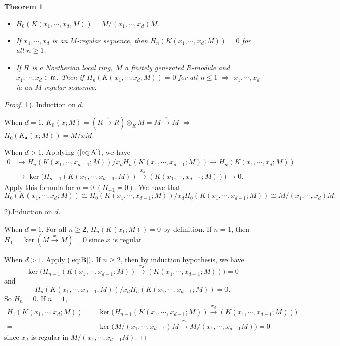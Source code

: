\documentclass[cs4size]{article}
\newcommand{\frm}{\mathfrak{m}}
\newcommand{\ra}{\rightarrow}
\newcommand{\xr}{\xrightarrow}
\newcommand{\Ra}{\Rightarrow}
\newtheorem{thm}{Theorem}
\begin{document}
\begin{thm}
\begin{itemize}
\item $H_0(K(x_1,\cdots,x_d,M))=M/(x_1,\cdots,x_d)M.$
\item If $x_1,\cdots,x_d$ is an $M$-regular sequence, then $H_n(K(x_1,\cdots,x_d;M))=0$ for all $n\geq 1$.
\item If $R$ is a Noetherian local ring, $M$ a finitely generated $R$-module and $x_1,\cdots,x_d\in\frm$. Then if $H_n(K(x_1,\cdots,x_d;M))=0$ for all $n\leq1$ $\Ra$ $x_1,\cdots,x_d$ ia an $M$-regular sequence.
\end{itemize}
\end{thm}
\begin{proof}
1). Induction on $d$.

When $d=1$. $K_0(x;M)=(R\xr{x}R)\otimes_RM=M\xr{x}M$ $\Ra$ $H_0(K_\bullet(x;M))=M/xM$.

When $d>1$. Applying $(\ref{eq:A})$, we have
\begin{equation}
\begin{split}
0&\ra H_n(K(x_1,\cdots,x_{d-1};M))/x_dH_n(K(x_1,\cdots,x_{d-1};M))\ra H_n(K(x_1,\cdots,x_d;M))\\
&\ra \ker \big(H_{n-1}(K(x_1,\cdots,x_{d-1};M))\xr{x_d}(K(x_1,\cdots,x_{d-1};M))\big)\ra 0.\label{eq:B}
\end{split}
\end{equation}
 Apply this formula for $n=0$ $(H_{-1}=0)$. We have that
\[H_0(K(x_1,\cdots,x_d;M))\cong H_0(K(x_1,\cdots,x_{d-1};M))/x_dH_0(K(x_1,\cdots,x_{d-1};M))\cong M/(x_1,\cdots,x_d)M.\]

2).Induction on $d$.

When $d=1$. For all $n\geq 2$, $H_n(K(x_1;M))=0$ by definition. If $n=1$, then $H_1=\ker(M\xr{x} M)=0$ since $x$ is regular.

When $d>1$. Apply $(\ref{eq:B})$. If $n\geq 2$, then by induction hypothesis, we have
\[\ker \big(H_{n-1}(K(x_1,\cdots,x_{d-1};M))\xr{x_d}(K(x_1,\cdots,x_{d-1};M))\big)=0\] and
\[H_n(K(x_1,\cdots,x_{d-1};M))/x_dH_n(K(x_1,\cdots,x_{d-1};M))=0.\]
So $H_n=0$.
If $n=1$,
\begin{align*}
H_1(K(x_1,\cdots,x_d;M))=&\ker \big(H_{n-1}(K(x_1,\cdots,x_{d-1};M))\xr{x_d}(K(x_1,\cdots,x_{d-1};M))\big)\\
=&\ker \big(M/(x_1,\cdots,x_{d-1})M\xr{x_d}M/(x_1,\cdots,x_{d-1}M)\big)=0
\end{align*}
since $x_d$ is regular in $M/(x_1,\cdots,x_{d-1}M)$.


\end{proof}
\end{document}
